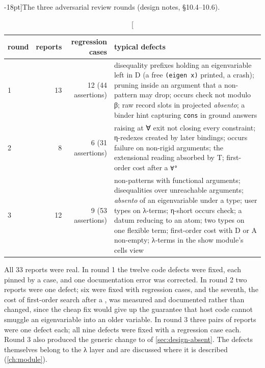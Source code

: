 \begin{table}[ht]
\footnotesize
\caption[][-18pt]{The three adversarial review rounds (design notes, §10.4--10.6).}
\label{tab:design-reviews}
\renewcommand{\arraystretch}{1.2}
\begin{tabularx}{\linewidth}{@{}lrr>{\raggedright\arraybackslash}X@{}}
\toprule
round & reports & regression cases & typical defects\\
\midrule
1 & 13 & 12 (44 assertions) & disequality prefixes holding an eigenvariable left in D (a free \texttt{(eigen x)} printed, a crash); pruning inside an argument that a non-pattern may drop; occurs check not modulo β; raw record slots in projected \emph{absento}; a binder hint capturing \texttt{cons} in ground answers\\
2 & 8 & 6 (31 assertions) & raising at ∀ exit not closing every constraint; η-redexes created by later bindings; occurs failure on non-rigid arguments; the extensional reading absorbed by T; first-order cost after a \texttt{∀°}\\
3 & 12 & 9 (53 assertions) & non-patterns with functional arguments; disequalities over unreachable arguments; \emph{absento} of an eigenvariable under a type; user types on λ-terms; η-short occurs check; a datum reducing to an atom; two types on one flexible term; first-order cost with D or A non-empty; λ-terms in the show module's cells view\\
\bottomrule
\end{tabularx}\par\vspace{28pt}%
\end{table}

All 33 reports were real. In round 1 the twelve code defects were fixed, each pinned by a case, and one
documentation error was corrected. In round 2 two reports were one defect; six were fixed with
regression cases, and the seventh, the cost of first-order search after a , was measured and
documented rather than changed, since the cheap fix would give up the guarantee that host code cannot
smuggle an eigenvariable into an older variable. In round 3 three pairs of reports were one defect each;
all nine defects were fixed with a regression case each. Round 3 also produced the generic change to
 of \cref{sec:design-absent}. The defects themselves belong to the λ layer and are discussed
where it is described (\cref{ch:module}).


